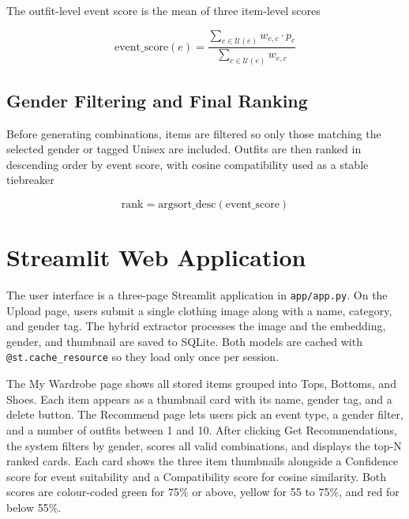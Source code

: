 \documentclass[conference]{IEEEtran}
\begin{document}
The outfit-level event score is the mean of three item-level scores

\begin{equation}
\text{event\_score}(e) = \frac{\displaystyle\sum_{c \in \mathcal{U}(e)} w_{e,c} \cdot p_c}{\displaystyle\sum_{c \in \mathcal{U}(e)} w_{e,c}}
\label{eq:eventscore}
\end{equation}

\subsection{Gender Filtering and Final Ranking}

Before generating combinations, items are filtered so only those matching the selected gender or tagged Unisex are included. Outfits are then ranked in descending order by event score, with cosine compatibility used as a stable tiebreaker

\begin{equation}
\text{rank} = \text{argsort\_desc}(\text{event\_score})
\label{eq:rank}
\end{equation}

\section{Streamlit Web Application}

The user interface is a three-page Streamlit application in \texttt{app/app.py}. On the Upload page, users submit a single clothing image along with a name, category, and gender tag. The hybrid extractor processes the image and the embedding, gender, and thumbnail are saved to SQLite. Both models are cached with \texttt{@st.cache\_resource} so they load only once per session.

The My Wardrobe page shows all stored items grouped into Tops, Bottoms, and Shoes. Each item appears as a thumbnail card with its name, gender tag, and a delete button. The Recommend page lets users pick an event type, a gender filter, and a number of outfits between 1 and 10. After clicking Get Recommendations, the system filters by gender, scores all valid combinations, and displays the top-N ranked cards. Each card shows the three item thumbnails alongside a Confidence score for event suitability and a Compatibility score for cosine similarity. Both scores are colour-coded green for 75\% or above, yellow for 55 to 75\%, and red for below 55\%.
\end{document}
